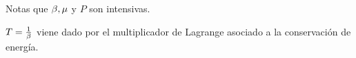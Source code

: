 Notas que $\beta,\mu$ y $P$ son intensivas.

$T=\frac{1}{\beta}$ viene dado por el multiplicador de Lagrange asociado a la conservación de energía.





































